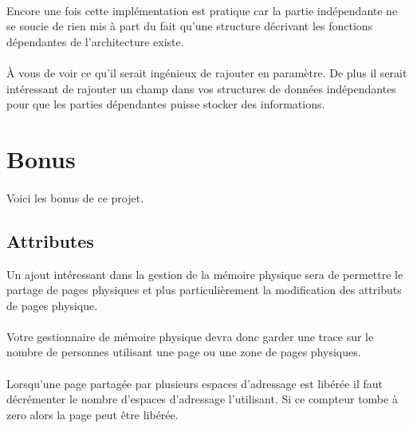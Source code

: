 \documentclass[10pt,a4wide]{article}
\begin{document}
\paragraph{}

Encore une fois cette impl\'ementation est pratique car la partie
ind\'ependante ne se soucie de rien mis \`a part du fait qu'une structure
d\'ecrivant les fonctions d\'ependantes de l'architecture existe.

\paragraph{}

\`A vous de voir ce qu'il serait ing\'enieux de rajouter en param\`etre.
De plus il serait int\'eressant de rajouter un champ dans vos structures
de donn\'ees ind\'ependantes pour que les parties d\'ependantes puisse
stocker des informations.

\section{Bonus}

\paragraph{}

Voici les bonus de ce projet.

\subsection{Attributes}

Un ajout int\'eressant dans la gestion de la m\'emoire physique sera
de permettre le partage de pages physiques et plus particuli\`erement
la modification des attributs de pages physique.

\paragraph{}

Votre gestionnaire de m\'emoire physique devra donc garder une trace sur
le nombre de personnes utilisant une page ou une zone de pages physiques.

\paragraph{}

Lorsqu'une page partag\'ee par plusieurs espaces d'adressage est lib\'er\'ee
il faut d\'ecr\'ementer le nombre d'espaces d'adressage l'utilisant. Si ce
compteur tombe \`a zero alors la page peut \^etre lib\'er\'ee.
\end{document}
